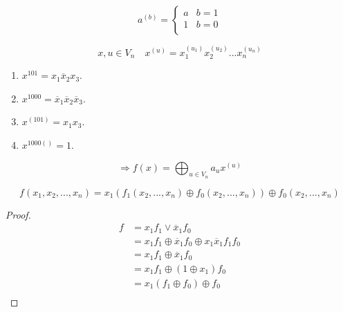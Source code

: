 \begin{equation*}
    a^{(b)} = \left\{ \begin{array}{cc}
        a & b = 1 \\
        1 & b = 0 \\
    \end{array} \right.
\end{equation*}

\begin{equation*}
    x, u \in V_n \quad x^{(u)} = x_1^{(u_1)} x_2^{(u_2)} ... x_n^{(u_n)}
\end{equation*}

\begin{example}
    \begin{enumerate}
        \item $x^{101} = x_1 \overline{x}_2 x_3$.
        \item $x^{1000} = \overline{x}_1 \overline{x}_2 \overline{x}_3$.
        \item $x^{(101)} = x_1 x_3$.
        \item $x^{1000()} = 1$.
    \end{enumerate}
\end{example}

\begin{equation}
    \Rightarrow f(x) = \bigoplus_{u \in V_n} a_u x^{(u)}
\end{equation}

\begin{claim}
    \begin{equation}
        f(x_1, x_2, ..., x_n)  =x_1 (f_1(x_2, ..., x_n) \oplus f_0(x_2, ..., x_n)) \oplus f_0(x_2, ..., x_n)
    \end{equation}
\end{claim}
\begin{proof}
    \begin{equation*}
        \begin{split}
            f
            &= x_1 f_1 \vee \overline{x}_1 f_0 \\
            &= x_1 f_1 \oplus \overline{x}_1 f_0 \oplus x_1 \overline{x}_1 f_1 f_0 \\
            &= x_1 f_1 \oplus \overline{x}_1 f_0 \\
            &= x_1 f_1 \oplus (1 \oplus x_1) f_0 \\
            &= x_1 (f_1 \oplus f_0) \oplus f_0 \\
        \end{split}
    \end{equation*}
\end{proof}

